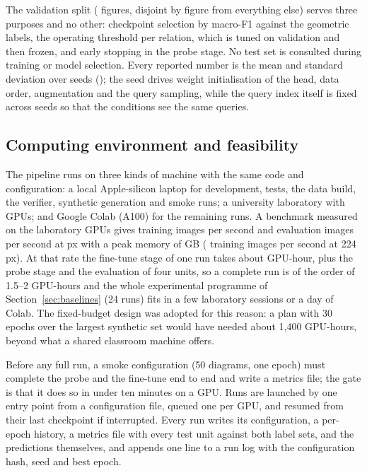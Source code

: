 The validation split (\nFiguresVal{} figures, disjoint by figure from everything else) serves three purposes and no other: checkpoint selection by macro-F1 against the geometric labels, the operating threshold per relation, which is tuned on validation and then frozen, and early stopping in the probe stage. No test set is consulted during training or model selection. Every reported number is the mean and standard deviation over \nSeeds{} seeds (\seedList); the seed drives weight initialisation of the head, data order, augmentation and the query sampling, while the query index itself is fixed across seeds so that the conditions see the same queries.

\subsection{Computing environment and feasibility}

The pipeline runs on three kinds of machine with the same code and configuration: a local Apple-silicon laptop for development, tests, the data build, the verifier, synthetic generation and smoke runs; a university laboratory with \benchGPUs{} \benchGPU{} GPUs; and Google Colab (A100) for the remaining runs. A benchmark measured on the laboratory GPUs gives \benchTrainImgPerS{} training images per second and \benchEvalImgPerS{} evaluation images per second at  px with a peak memory of \benchPeakMemGB{} GB (\benchTrainImgPerSLow{} training images per second at 224 px). At that rate the fine-tune stage of one run takes about \ftHoursPerRun{} GPU-hour, plus the probe stage and the evaluation of four units, so a complete run is of the order of 1.5--2 GPU-hours and the whole experimental programme of Section~\ref{sec:baselines} (24 runs) fits in a few laboratory sessions or a day of Colab. The fixed-budget design was adopted for this reason: a plan with 30 epochs over the largest synthetic set would have needed about 1,400 GPU-hours, beyond what a shared classroom machine offers.

Before any full run, a smoke configuration (50 diagrams, one epoch) must complete the probe and the fine-tune end to end and write a metrics file; the gate is that it does so in under ten minutes on a GPU. Runs are launched by one entry point from a configuration file, queued one per GPU, and resumed from their last checkpoint if interrupted. Every run writes its configuration, a per-epoch history, a metrics file with every test unit against both label sets, and the predictions themselves, and appends one line to a run log with the configuration hash, seed and best epoch.
